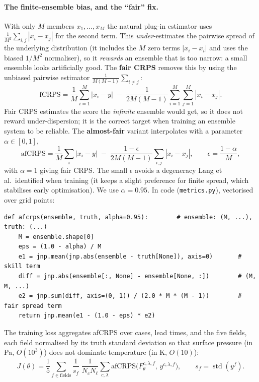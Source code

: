 \documentclass[11pt]{article}
\newcommand{\code}[1]{\texttt{#1}}
\begin{document}
\paragraph{The finite-ensemble bias, and the ``fair'' fix.} With only $M$ members
$x_1,\dots,x_M$ the natural plug-in estimator uses
$\tfrac{1}{M^2}\sum_{i,j}|x_i-x_j|$ for the second term. This
\emph{under}-estimates the pairwise spread of the underlying distribution (it
includes the $M$ zero terms $|x_i-x_i|$ and uses the biased $1/M^2$ normaliser),
so it \emph{rewards} an ensemble that is too narrow: a small ensemble looks
artificially good. The \textbf{fair CRPS} \citep{leutbecher2018,lang2024} removes
this by using the unbiased pairwise estimator $\tfrac{1}{M(M-1)}\sum_{i\ne j}$:
\begin{equation}
  \mathrm{fCRPS} = \frac{1}{M}\sum_{i=1}^{M}|x_i-y|
    \;-\; \frac{1}{2M(M-1)}\sum_{i=1}^{M}\sum_{j=1}^{M}|x_i-x_j|.
  \label{eq:faircrps}
\end{equation}
Fair CRPS estimates the score the \emph{infinite} ensemble would get, so it does
not reward under-dispersion; it is the correct target when training an ensemble
system to be reliable. The \textbf{almost-fair} variant \citep{lang2024}
interpolates with a parameter $\alpha\in[0,1]$,
\begin{equation}
  \mathrm{afCRPS} = \frac{1}{M}\sum_i |x_i-y|
    \;-\; \frac{1-\epsilon}{2M(M-1)}\sum_{i,j}|x_i-x_j|,
  \qquad \epsilon=\frac{1-\alpha}{M},
  \label{eq:afcrps}
\end{equation}
with $\alpha=1$ giving fair CRPS. The small $\epsilon$ avoids a degeneracy Lang
et al.\ identified when training (it keeps a slight preference for finite spread,
which stabilises early optimisation). We use $\alpha=0.95$. In code
(\code{metrics.py}), vectorised over grid points:
\begin{lstlisting}
def afcrps(ensemble, truth, alpha=0.95):        # ensemble: (M, ...), truth: (...)
    M = ensemble.shape[0]
    eps = (1.0 - alpha) / M
    e1 = jnp.mean(jnp.abs(ensemble - truth[None]), axis=0)       # skill term
    diff = jnp.abs(ensemble[:, None] - ensemble[None, :])        # (M, M, ...)
    e2 = jnp.sum(diff, axis=(0, 1)) / (2.0 * M * (M - 1))        # fair spread term
    return jnp.mean(e1 - (1.0 - eps) * e2)
\end{lstlisting}
The training loss aggregates afCRPS over cases, lead times, and the five fields,
each field normalised by its truth standard deviation so that surface pressure
(in Pa, $O(10^3)$) does not dominate temperature (in K, $O(10)$):
\begin{equation}
  J(\theta) = \frac{1}{5}\sum_{f\in\text{fields}}
    \frac{1}{s_f}\;
    \frac{1}{N_c N_\ell}\sum_{c,\lambda}
    \mathrm{afCRPS}\!\bigl(F_\theta^{c,\lambda,f},\, y^{c,\lambda,f}\bigr),
  \qquad s_f=\operatorname{std}(y^f).
  \label{eq:loss}
\end{equation}
\end{document}
